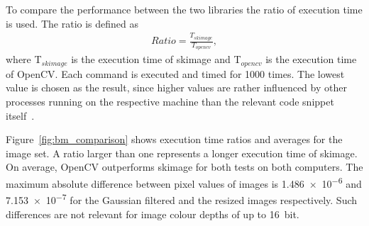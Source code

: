 To compare the performance between the two libraries the ratio of execution time is used. The ratio is defined as
\begin{align}
    Ratio = \frac{T_{skimage}}{T_{opencv}}, \label{eq:bm_exec_ratio}
\end{align}
where \gls{T}$_{skimage}$ is the execution time of \gls{skimage} and \gls{T}$_{opencv}$ is the execution time of OpenCV. Each command is executed and timed for 1000 times. The lowest value is chosen as the result, since higher values are rather influenced by other processes running on the respective machine than the relevant code snippet itself~\cite{timeit2020}.

Figure~\ref{fig:bm_comparison} shows execution time ratios and averages for the image set. A ratio larger than one represents a longer execution time of \gls{skimage}. On average, OpenCV outperforms \gls{skimage} for both tests on both computers. The maximum absolute difference between pixel values of images is \SI{1.486e-6}{} and \SI{7.153e-7}{} for the Gaussian filtered and the resized images respectively. Such differences are not relevant for image colour depths of up to \SI{16}{bit}.


